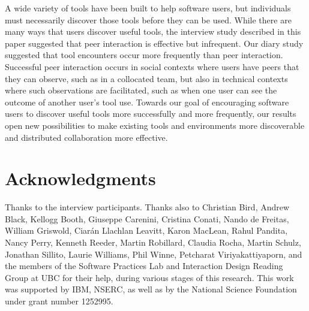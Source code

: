 \documentclass[smallextended]{svjour3}
\newcommand\discovery{peer interaction\xspace}
\newcommand\idrg[1]{\nb{IDRG}{#1}}
\begin{document}
\noindent
A wide variety of tools have been built to help software users, but individuals
must necessarily discover those tools before they can be used.
While there are many ways that users discover useful tools, 
the interview study described in this paper suggested that
\discovery is effective but infrequent. 
Our diary study suggested that tool encounters occur
more frequently than \discovery.
Successful \discovery occurs in social contexts where users have 
peers that they can observe, such as in a collocated team, 
but also in technical contexts where such observations are 
facilitated, such as when one user can see the outcome of another
user's tool use.
Towards our goal of encouraging software users to 
discover useful tools more successfully and more frequently,
our results open new possibilities to make existing tools and environments more
discoverable and distributed collaboration more effective.


\idrg{page numbers}

\section*{Acknowledgments}

\noindent
Thanks to the interview participants.
Thanks also to
Christian Bird,
Andrew Black,
Kellogg Booth,
Giuseppe Carenini,
Cristina Conati,
Nando de Freitas,
William Griswold,
Ciar\'an Llachlan Leavitt,
Karon MacLean,
Rahul Pandita,
Nancy Perry,
Kenneth Reeder,
Martin Robillard,
Claudia Rocha,
Martin Schulz,
Jonathan Sillito,
Laurie Williams,
Phil Winne,
Petcharat Viriyakattiyaporn,
and the members of the Software Practices Lab and
Interaction Design Reading Group at UBC
for their help, during various stages of this research.
This work was supported by IBM, NSERC,
as well as 
by the National Science Foundation under grant number 1252995.



\end{document}
